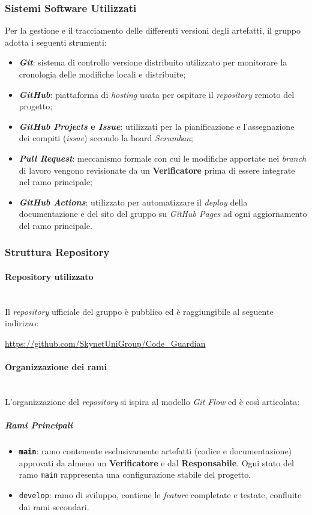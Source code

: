 \documentclass[12pt, a4paper]{article}
\begin{document}
\subsubsection{Sistemi Software Utilizzati}
Per la gestione e il tracciamento delle differenti versioni degli artefatti, il gruppo adotta i seguenti strumenti:
\begin{itemize}
    \item \textbf{\textit{Git}}: sistema di controllo versione distribuito utilizzato per monitorare la cronologia delle modifiche locali e distribuite;
    \item \textbf{\textit{GitHub}}: piattaforma di \textit{hosting} usata per ospitare il \textit{repository} remoto del progetto;
    \item \textbf{\textit{GitHub Projects} e \textit{Issue}}: utilizzati per la pianificazione e l'assegnazione dei compiti (\textit{issue}) secondo la board \textit{Scrumban};
    \item \textbf{\textit{Pull Request}}: meccanismo formale con cui le modifiche apportate nei \textit{branch} di lavoro vengono revisionate da un \textbf{Verificatore} prima di essere integrate nel ramo principale;
    \item \textbf{\textit{GitHub Actions}}: utilizzato per automatizzare il \textit{deploy} della documentazione e del sito del gruppo su \textit{GitHub Pages} ad ogni aggiornamento del ramo principale.
\end{itemize}

\newpage
\subsubsection{Struttura Repository}
\paragraph{Repository utilizzato}~\\
Il \textit{repository} ufficiale del gruppo è pubblico ed è raggiungibile al seguente indirizzo:
\begin{center}
    \url{https://github.com/SkynetUniGroup/Code_Guardian}
\end{center}

\paragraph{Organizzazione dei rami}~\\
L'organizzazione del \textit{repository} si ispira al modello \textit{Git Flow} ed è così articolata:
\subparagraph{Rami Principali}
\begin{itemize}
    \item \textbf{\texttt{main}}: ramo contenente esclusivamente artefatti (codice e documentazione) approvati da almeno un \textbf{Verificatore} e dal \textbf{Responsabile}. Ogni stato del ramo \texttt{main} rappresenta una configurazione stabile del progetto.
    \item \texttt{develop}: ramo di sviluppo, contiene le \textit{feature} completate e testate, confluite dai rami secondari.
\end{itemize}
\end{document}
